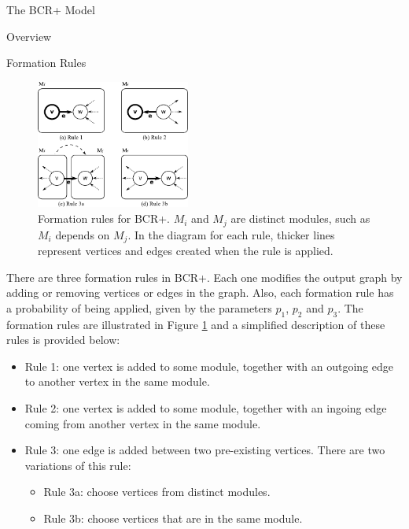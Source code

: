 \documentclass[11pt,twocolumn,a4paper,english]{article}
\begin{document}
\begin{section}{The BCR+ Model}
\begin{subsection}{Overview}
\end{subsection}	

\begin{subsection}{Formation Rules}

\begin{figure}[tbp]
	\centering
		\includegraphics[width=0.45\textwidth]{figures/bcr-rules}
	\caption{Formation rules for BCR+. $M_i$ and $M_j$ are distinct modules, such as $M_i$ depends on $M_j$. In the diagram for each rule, thicker lines represent vertices and edges created when the rule is applied.}
	\label{fig:bcr-rules}
\end{figure}

	
	There are three formation rules in BCR+. Each one modifies the output graph by adding or removing vertices or edges in the graph. Also, each formation rule has a probability of being applied, given by the parameters $p_1$, $p_2$ and $p_3$.
The formation rules are illustrated in Figure \ref{fig:bcr-rules} and a simplified description of these rules is provided below:
	\begin{itemize}
		\item Rule 1: one vertex is added to some module, together with an outgoing edge to another vertex in the same module.
		\item Rule 2: one vertex is added to some module, together with an ingoing edge coming from another vertex in the same module.
		\item Rule 3: one edge is added between two pre-existing vertices. There are two variations of this rule:
		\begin{itemize}
			\item Rule 3a: choose vertices from distinct modules.
			\item Rule 3b: choose vertices that are in the same module.
		\end{itemize}
	\end{itemize}
	

\end{subsection}
\end{section}
\end{document}
